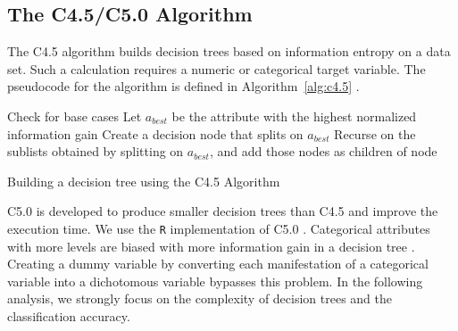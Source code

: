 \documentclass[a4paper,twoside]{style/article}
\begin{document}
\subsection{The C4.5/C5.0 Algorithm}
\label{sec:C5.0}
The C4.5 algorithm builds decision trees based on information entropy on a data set.
Such a calculation requires a numeric or categorical target variable.
The pseudocode for the algorithm is defined in Algorithm~\ref{alg:c4.5} \cite{C4.5Algorithm}.
\begin{algorithm}[]
 Check for base cases\;
 Let $a_{best}$ be the attribute with the highest normalized information gain\;
 Create a decision node that splits on $a_{best}$\;
 Recurse on the sublists obtained by splitting on $a_{best}$, and add those nodes as children of node\;
 \caption{Building a decision tree using the C4.5 Algorithm}
 \label{alg:c4.5}
\end{algorithm}
C5.0 is developed to produce smaller decision trees than C4.5 and improve the execution time.
We use the \texttt{R} implementation of C5.0 \cite{c5.0classification}.
Categorical attributes with more levels are biased with more information gain in a decision tree \cite{deng2011bias}.
Creating a dummy variable by converting each manifestation of a categorical variable into a dichotomous variable bypasses this problem.
%
In the following analysis, we strongly focus on the complexity of decision trees and the classification accuracy.
\end{document}
